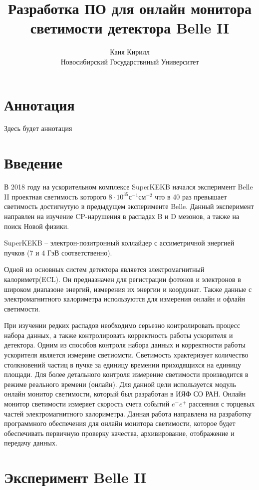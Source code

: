 \documentclass[a4paper, 12pt]{article}
\title{Разработка ПО для онлайн монитора светимости детектора Belle II}
\author{Каня Кирилл\\Новосибирский Государствнный Университет}
\begin{document}
\maketitle
\newpage

\section*{Аннотация}
Здесь будет аннотация
\newpage

\tableofcontents
\newpage

\section{Введение}
  В 2018 году на ускорительном комплексе SuperKEKB начался эксперимент Belle II проектная светимость которого $8\cdot10^{35}$с$^{-1}$см$^{-2}$ что в 40 раз превышает светимость достигнутую в предыдущем эксперименте Belle. Данный эксперимент направлен на изучение CP-нарушения в распадах B и D мезонов, а также на поиск Новой физики.\par
  SuperKEKB -- электрон-позитронный коллайдер с ассиметричной энергией пучков (7 и 4 ГэВ соответственно).\par
  Одной из основных систем детектора является электромагнитный калориметр(ECL). Он предназначен для регистрации фотонов и электронов в широком диапазоне энергий, измерения их энергии и координат. Также данные с электромагнитного калориметра используются для измерения онлайн и офлайн светимости.\par
  При изучении редких распадов необходимо серьезно контролировать процесс набора данных, а также контролировать корректность работы ускорителя и детектора. Одним из способов контроля набора данных и корректности работы ускорителя является измерние светиомсти. Светимость храктеризует количество столкновений частиц в пучке за единицу времении приходящихся на единицу площади. Для более детального контроля измерение светимости производится в режиме реального времени (онлайн). Для данной цели используется модуль онлайн монитор светимости, который был разработан в ИЯФ СО РАН. Онлайн монитор светимости измеряет скорость счета событий $e^-e^+$ рассеяния с торцевых частей электромагнитного калориметра. Данная работа направлена на разработку программного обеспечения для онлайн монитора светимости, которое будет обеспечивать первичную проверку качества, архивирование, отображение и передачу данных.\par

\section{Эксперимент Belle II}
\end{document}
